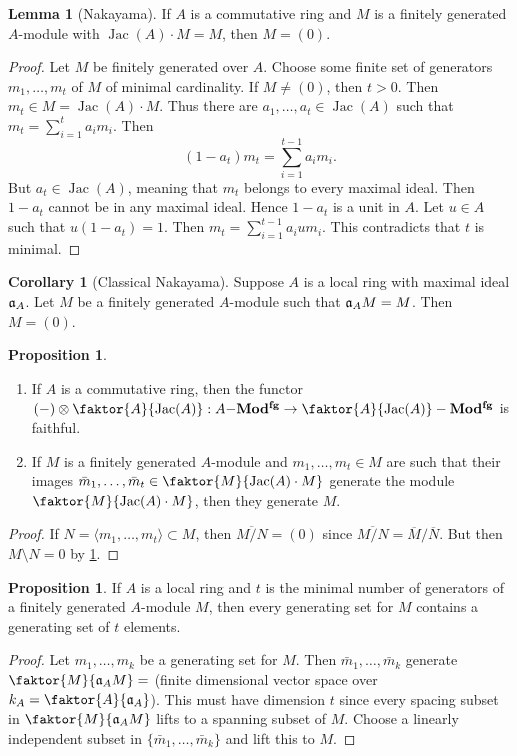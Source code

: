 \documentclass[10pt,letterpaper,cm]{nupset}
\theoremstyle{definition}
\theoremstyle{theorem}
\newtheorem{lemma}[definition]{Lemma}
\newtheorem{prop}[definition]{Proposition}
\newtheorem{corollary}[definition]{Corollary}
\theoremstyle{remark}
\newcommand{\1}{\mathbf{1}}
\newcommand{\0}{\vec 0}
\DeclareMathOperator{\Jac}{Jac}
\begin{document}
\begin{lemma}[Nakayama]\label{Nak}
If $A$ is a commutative ring and $M$ is a finitely generated $A$-module with $\Jac(A) \cdot M = M$, then $M= (0)$.
\end{lemma}
\begin{proof}
Let $M$ be finitely generated over $A$. Choose some finite set of generators $m_1, \ldots, m_t$ of $M$ of minimal cardinality. If $M\ne (0)$, then $t>0$. Then $m_t \in M = \Jac(A)\cdot M$. Thus there are $a_1, \ldots, a_t \in \Jac(A)$ such that $m_t = \sum_{i=1}^t a_im_i$. Then $$(1-a_t)m_t = \sum_{i=1}^{t-1} a_im_i.$$ But $a_t \in \Jac(A)$, meaning that $m_t$ belongs to every maximal ideal. Then $1-a_t$ cannot be in any maximal ideal. Hence $1-a_t$ is a unit in $A$. Let $u\in A$ such that $u(1-a_t) = 1$. Then $m_t = \sum_{i=1}^{t-1} a_iu m_i$. This contradicts that $t$ is minimal.
\end{proof}

\begin{corollary}[Classical Nakayama]
Suppose $A$ is a local ring with maximal ideal $\frak{a}_A$. Let $M$ be a finitely generated $A$-module such that $\frak{a}_AM = M$. Then $M= (0)$. 
\end{corollary}

\begin{prop} $ $
\begin{enumerate}
\item If $A$ is a commutative ring,  then the functor $(-) \otimes \faktor{A}{\Jac(A)} : A{-}\mathbf{Mod^{fg}} \to \faktor{A}{\Jac(A)} - \mathbf{Mod^{fg}}$ is faithful.  
\item If $M$ is a finitely generated $A$-module and $m_1, \ldots, m_t \in M$ are such that their images $\bar{m}_1, \ldots, \bar{m}_t \in \faktor{M}{\Jac(A) \cdot M}$ generate the module $\faktor{M}{\Jac(A)\cdot M}$, then they generate $M$.
\end{enumerate}
\end{prop}
\begin{proof}
If $N = \langle m_1, \ldots, m_t \rangle \subset M$, then $\overline{M/N} = (0)$ since $\overline{M/N} = \overline{M}/\overline{N}$. But then $M \setminus N = 0$ by \cref{Nak}. 
\end{proof}

\begin{prop}
If $A$ is a local ring and $t$ is the minimal number of generators of a finitely generated $A$-module $M$, then every generating set for $M$ contains a generating set of $t$ elements. 
\end{prop}
\begin{proof}
Let $m_1, \ldots, m_k$ be a generating set for $M$. Then $\bar{m}_1, \ldots, \bar{m}_k$ generate $\faktor{M}{\frak{a}_A M} =$ (finite dimensional vector space over $k_A = \faktor{A}{\frak{a}_A}$). This must have dimension $t$ since every spacing subset in $\faktor{M}{\frak{a}_A M}$ lifts to a spanning subset of $M$. Choose a linearly independent subset in $\{\bar{m}_1, \ldots, \bar{m}_k\}$ and lift this to $M$.
\end{proof}
\end{document}
